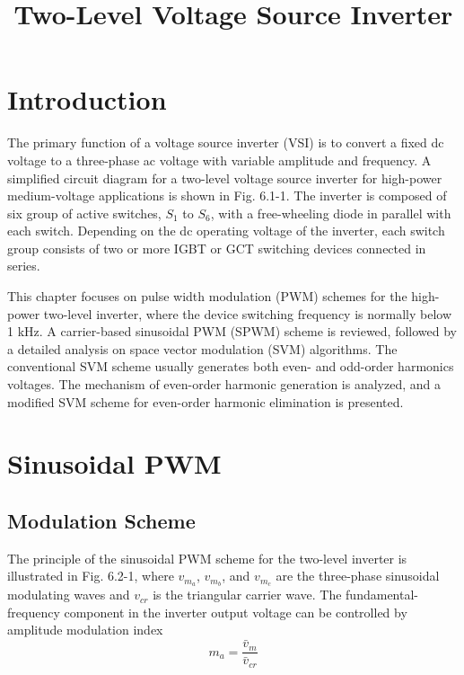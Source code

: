 \documentclass[letterpaper,12pt]{article}
\title{Two-Level Voltage Source Inverter}
\author{}
\date{}
\begin{document}
\setcounter{page}{95}

\maketitle
\thispagestyle{fancy} %

\section{Introduction}
The primary function of a voltage source inverter (VSI) is to convert a fixed dc voltage to a three-phase ac voltage with variable amplitude and frequency. A simplified circuit diagram for a two-level voltage source inverter for high-power medium-voltage applications is shown in Fig. 6.1-1. The inverter is composed of six group of active switches, $S_1$ to $S_6$, with a free-wheeling diode in parallel with each switch. Depending on the dc operating voltage of the inverter, each switch group consists of two or more IGBT or GCT switching devices connected in series.

This chapter focuses on pulse width modulation (PWM) schemes for the high-power two-level inverter, where the device switching frequency is normally below 1 kHz. A carrier-based sinusoidal PWM (SPWM) scheme is reviewed, followed by a detailed analysis on space vector modulation (SVM) algorithms. The conventional SVM scheme usually generates both even- and odd-order harmonics voltages. The mechanism of even-order harmonic generation is analyzed, and a modified SVM scheme for even-order harmonic elimination is presented.

\section{Sinusoidal PWM}
\subsection{Modulation Scheme}
The principle of the sinusoidal PWM scheme for the two-level inverter is illustrated in Fig. 6.2-1, where $v_{m_a}$, $v_{m_b}$, and $v_{m_c}$ are the three-phase sinusoidal modulating waves and $v_{cr}$ is the triangular carrier wave. The fundamental-frequency component in the inverter output voltage can be controlled by amplitude modulation index
\[
	m_a = \frac{\bar{v}_m}{\bar{v}_{cr}}
\]
\end{document}

